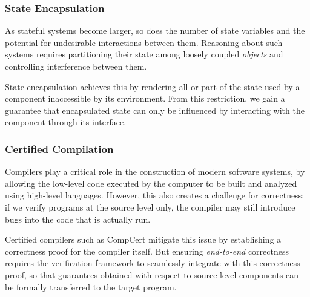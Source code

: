 \documentclass[acmsmall,screen,review,anonymous]{acmart}
\begin{document}

\subsubsection{State Encapsulation} %

As stateful systems become larger,
so does the number of state variables
and the potential for undesirable interactions between them.
Reasoning about such systems
requires partitioning their state
among loosely coupled \emph{objects}
and controlling interference between them.

State encapsulation achieves this by rendering
all or part of the state used by a component
inaccessible by its environment.
From this restriction,
we gain a guarantee that
encapsulated state can only be influenced
by interacting with the component through its interface.



\subsubsection{Certified Compilation} %

Compilers play a critical role
in the construction of modern software systems,
by allowing the low-level code
executed by the computer
to be built and analyzed
using high-level languages.
However, this also creates a challenge
for correctness:
if we verify programs at the source level only,
the compiler may still introduce bugs
into the code that is actually run.

Certified compilers such as CompCert \cite{compcert}
mitigate this issue by
establishing a correctness proof for the compiler itself.
But ensuring \emph{end-to-end} correctness
requires the verification framework to seamlessly integrate
with this correctness proof,
so that guarantees obtained with respect to source-level components
can be formally transferred to the target program.
\end{document}
